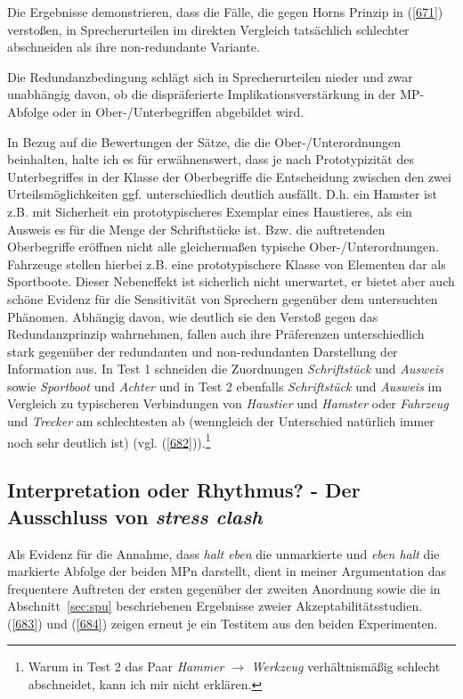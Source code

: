 Die Ergebnisse demonstrieren, dass die Fälle, die gegen Horns Prinzip in (\ref{671}) verstoßen, in Sprecherurteilen im direkten Vergleich tatsächlich schlechter abschneiden als ihre non-redundante Variante.

Die Redundanzbedingung  schlägt sich in Sprecherurteilen nieder und zwar unabhängig davon, ob die dispräferierte Implikationsverstärkung in der MP-Abfolge oder in Ober-/Unterbegriffen abgebildet wird.

In Bezug auf die Bewertungen der Sätze, die die Ober-/Unterordnungen beinhalten, halte ich es für erwähnenswert, dass je nach Prototypizität  des Unterbegriffes in der Klasse der Oberbegriffe die Entscheidung zwischen den zwei Urteilsmöglichkeiten ggf. unterschiedlich deutlich ausfällt. D.h. ein Hamster ist z.B. mit Sicherheit ein prototypischeres Exemplar eines Haustieres, als ein Ausweis es für die Menge der Schriftstücke ist. Bzw. die auftretenden Oberbegriffe eröffnen nicht alle gleichermaßen typische Ober-/Unterordnungen. Fahr\-zeuge stellen hierbei z.B. eine prototypischere Klasse von Elementen dar als Sportboote. Dieser Nebeneffekt ist sicherlich nicht unerwartet, er bietet aber auch schöne Evidenz für die Sensitivität von Sprechern gegenüber dem untersuchten Phänomen. Abhängig davon, wie deutlich sie den Verstoß gegen das Redundanzprinzip wahr\-nehmen, fallen auch ihre Präferenzen unterschiedlich stark ge\-genüber der redundanten und non-redundanten Darstellung der Information aus. In Test 1 schneiden die Zuordnungen \textit{Schriftstück} und \textit{Ausweis} sowie \textit{Sportboot} und \textit{Achter} und in Test 2 ebenfalls \textit{Schriftstück} und \textit{Ausweis} im Vergleich zu ty\-pischeren Verbindungen von \textit{Haustier} und \textit{Hamster} oder \textit{Fahrzeug} und \textit{Trecker} am schlech\-testen ab (wenn\-gleich der Unterschied natürlich immer noch sehr deutlich ist) (vgl. (\ref{682})).\footnote{Warum in Test 2 das Paar \textit{Hammer} $\rightarrow$ \textit{Werkzeug} verhältnismäßig schlecht abschneidet, kann ich mir nicht erklären.}

\subsection{Interpretation oder Rhythmus? - Der Ausschluss von \textit{stress clash}}
\label{sec:stressclash}
Als Evidenz für die Annahme, dass \textit{halt eben} die unmarkierte und \textit{eben halt} die markierte Abfolge der beiden MPn darstellt, dient in meiner Argumentation das frequentere Auftreten der ersten gegenüber der zweiten Anordnung sowie die in Abschnitt~\ref{sec:spu} beschriebenen Ergebnisse zweier Akzeptabilitätsstudien. (\ref{683}) und (\ref{684}) zeigen erneut je ein Testitem aus den beiden Experimenten.

